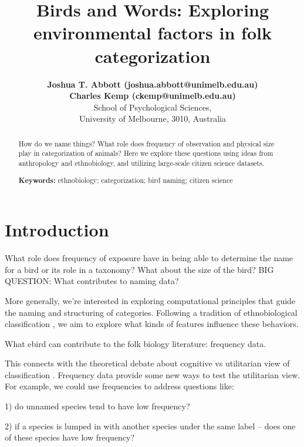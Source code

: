 \documentclass[10pt,letterpaper]{article}
\title{Birds and Words: Exploring environmental factors in folk categorization}
\author{{\large \bf Joshua T. Abbott (joshua.abbott@unimelb.edu.au)} \\
 {\large \bf Charles Kemp (ckemp@unimelb.edu.au)} \\
  School of Psychological Sciences,  \\
  University of Melbourne, 3010, Australia}
\begin{document}
\maketitle


\begin{abstract}
How do we name things? What role does frequency of observation and physical size play in categorization of animals? Here we explore these questions using ideas from anthropology and ethnobiology, and utilizing large-scale citizen science datasets.

\textbf{Keywords:} 
ethnobiology; categorization; bird naming; citizen science
\end{abstract}


\section{Introduction}

What role does frequency of exposure have in being able to determine the name for a bird or its role in a taxonomy? What about the size of the bird? BIG QUESTION: What contributes to naming data?

More generally, we're interested in exploring computational principles that guide the naming and structuring of categories. Following a tradition of ethnobiological classification \cite{berlin1973general,berlin2014ethnobiological}, we aim to explore what kinds of features influence these behaviors. 


What ebird can contribute to the folk biology literature: frequency data.

This connects with the theoretical debate about cognitive vs utilitarian view of classification \cite{hunn1982utilitarian,lopez1997tree}. Frequency data provide some new ways to test the utilitarian view. For example, we could use frequencies to address questions like:

1) do unnamed species tend to have low frequency?

2) if a species is lumped in with another species under the same label -- does one of these species have low frequency?
\end{document}
